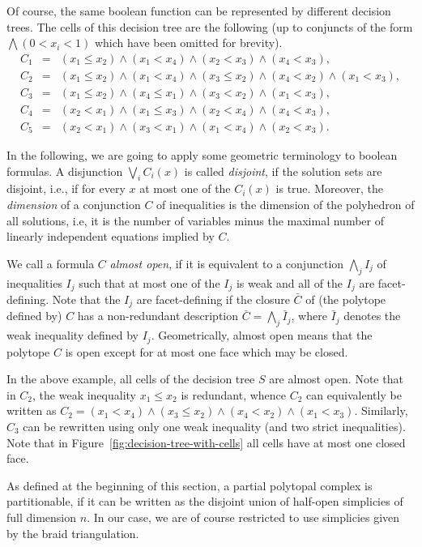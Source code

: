 \documentclass[12pt,reqno]{amsart}
\numberwithin{definition}{section}
\theoremstyle{definition}
\begin{document}
Of course, the same boolean function can be represented by different decision trees. The cells of this decision tree are the following (up to conjuncts of the form $\bigwedge (0 < x_i <1)$ which have been omitted for brevity).
\begin{align*}
C_1 &=& (x_1\leq x_2) \wedge (x_1 < x_4) \wedge (x_2 < x_3) \wedge (x_4 < x_3), \\
C_2 &=& (x_1\leq x_2) \wedge (x_1 < x_4) \wedge (x_3 \leq x_2) \wedge (x_4 < x_2) \wedge (x_1 < x_3), \\
C_3 &=& (x_1\leq x_2) \wedge (x_4 \leq x_1) \wedge (x_3 < x_2) \wedge (x_1 < x_3), \\
C_4 &=& (x_2 < x_1) \wedge (x_1 \leq x_3) \wedge (x_2 < x_4) \wedge (x_4 < x_3), \\
C_5 &=& (x_2 < x_1) \wedge (x_3 < x_1) \wedge (x_1 < x_4) \wedge (x_2 < x_3).
\end{align*}

In the following, we are going to apply some geometric terminology to boolean formulas. A disjunction $\bigvee_i C_i(x)$ is called \emph{disjoint}, if the solution sets are disjoint, i.e., if for every $x$ at most one of the $C_i(x)$ is true. Moreover, the \emph{dimension} of a conjunction $C$ of inequalities is the dimension of the polyhedron of all solutions, i.e, it is the number of variables minus the maximal number of linearly independent equations implied by $C$.

We call a formula $C$ \emph{almost open}, if it is equivalent to a conjunction $\bigwedge_j I_{j}$ of inequalities $I_j$ such that at most one of the $I_j$ is weak and all of the $I_j$ are facet-defining. Note that the $I_j$ are facet-defining if the closure $\bar{C}$ of (the polytope defined by) $C$ has a non-redundant description $\bar{C} = \bigwedge_j \bar{I}_j$, where $\bar{I}_j$ denotes the weak inequality defined by $I_j$. Geometrically, almost open means that the polytope $C$ is open except for at most one face which may be closed.

In the above example, all cells of the decision tree $S$ are almost open. Note that in $C_2$, the weak inequality $x_1 \leq x_2$ is redundant, whence $C_2$ can equivalently be written as $C_2 = (x_1 < x_4) \wedge (x_3 \leq x_2) \wedge (x_4 < x_2) \wedge (x_1 < x_3)$. Similarly, $C_3$ can be rewritten using only one weak inequality (and two strict inequalities). Note that in Figure~\ref{fig:decision-tree-with-cells} all cells have at most one closed face.

As defined at the beginning of this section, a partial polytopal complex is partitionable, if it can be written as the disjoint union of half-open simplicies of full dimension $n$. In our case, we are of course restricted to use simplicies given by the braid triangulation.
\end{document}
